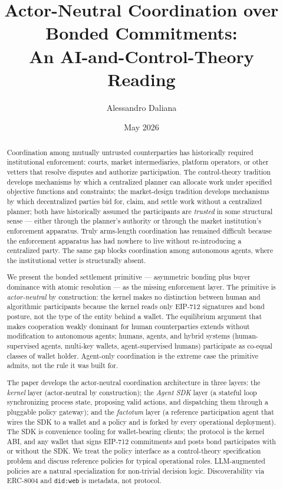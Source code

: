 \documentclass[11pt,a4paper]{article}
\title{%
  Actor-Neutral Coordination over Bonded Commitments:\\
  An AI-and-Control-Theory Reading%
}
\author{
  Alessandro Daliana
}
\date{May 2026}
\theoremstyle{definition}
\theoremstyle{remark}
\begin{document}
\maketitle

\begin{abstract}
Coordination among mutually untrusted counterparties has historically
required institutional enforcement: courts, market intermediaries,
platform operators, or other vetters that resolve disputes and
authorize participation. The control-theory tradition develops
mechanisms by which a centralized planner can allocate work under
specified objective functions and constraints; the market-design
tradition develops mechanisms by which decentralized parties bid for,
claim, and settle work without a centralized planner; both have
historically assumed the participants are \emph{trusted} in some
structural sense --- either through the planner's authority or
through the market institution's enforcement apparatus. Truly
arms-length coordination has remained difficult because the
enforcement apparatus has had nowhere to live without re-introducing
a centralized party. The same gap blocks coordination among
autonomous agents, where the institutional vetter is structurally
absent.

We present the bonded settlement primitive --- asymmetric bonding
plus buyer dominance with atomic resolution --- as the missing
enforcement layer. The primitive is \emph{actor-neutral} by
construction: the kernel makes no distinction between human and
algorithmic participants because the kernel reads only EIP-712
signatures and bond posture, not the type of the entity behind a
wallet. The equilibrium argument that makes cooperation weakly
dominant for human counterparties extends without modification to
autonomous agents; humans, agents, and hybrid systems
(human-supervised agents, multi-key wallets, agent-supervised
humans) participate as co-equal classes of wallet holder.
Agent-only coordination is the extreme case the primitive admits,
not the rule it was built for.

The paper develops the actor-neutral coordination architecture in
three layers: the \emph{kernel} layer (actor-neutral by
construction); the \emph{Agent SDK} layer (a stateful loop
synchronizing process state, proposing valid actions, and
dispatching them through a pluggable policy gateway); and the
\emph{factotum} layer (a reference participation agent that wires
the SDK to a wallet and a policy and is forked by every
operational deployment). The SDK is convenience tooling for
wallet-bearing clients; the protocol is the kernel ABI, and any
wallet that signs EIP-712 commitments and posts bond participates
with or without the SDK. We treat the policy interface as a
control-theory specification problem and discuss reference
policies for typical operational roles. LLM-augmented policies
are a natural specialization for non-trivial decision logic.
Discoverability via ERC-8004 and \texttt{did:web} is metadata, not
protocol.
\end{abstract}
\end{document}
